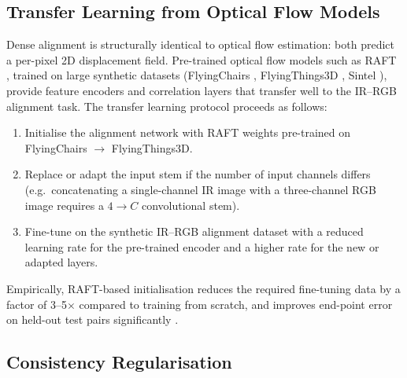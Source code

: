 \subsection{Transfer Learning from Optical Flow Models}
\label{subsec:transfer}

Dense alignment is structurally identical to optical flow estimation: both
predict a per-pixel 2D displacement field.  Pre-trained optical flow models
such as RAFT \cite{teed2020raft}, trained on large synthetic datasets
(FlyingChairs \cite{dosovitskiy2015flownet}, FlyingThings3D
\cite{mayer2016large}, Sintel \cite{butler2012sintel}), provide feature
encoders and correlation layers that transfer well to the IR--RGB alignment
task.  The transfer learning protocol proceeds as follows:
\begin{enumerate}
    \item Initialise the alignment network with RAFT weights pre-trained on
          FlyingChairs $\to$ FlyingThings3D.
    \item Replace or adapt the input stem if the number of input channels
          differs (e.g.\ concatenating a single-channel IR image with a
          three-channel RGB image requires a $4 \to C$ convolutional stem).
    \item Fine-tune on the synthetic IR--RGB alignment dataset with a reduced
          learning rate for the pre-trained encoder and a higher rate for the
          new or adapted layers.
\end{enumerate}
Empirically, RAFT-based initialisation reduces the required fine-tuning data
by a factor of 3--5$\times$ compared to training from scratch, and improves
end-point error on held-out test pairs significantly
\cite{teed2020raft, sun2021autoflow}.

\subsection{Consistency Regularisation}
\label{subsec:consistency}

